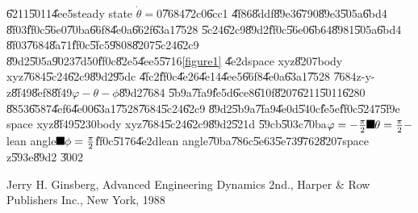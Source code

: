 \documentclass{article}
\begin{document}
\U{6211}\U{5011}\U{4ee5}steady state $\dot{\theta}=0$\U{7684}\U{72c0}\U{6cc1}%
\U{4f86}\U{8ddf}\U{89e3}\U{6790}\U{89e3}\cite{Ginsberg}\U{505a}\U{6bd4}%
\U{8f03}\U{ff0c}\U{56e0}\U{70ba}\U{66f8}\U{4e0a}\U{662f}\U{63a1}\U{7528}%
\U{5c24}\U{62c9}\U{89d2}\U{ff0c}\U{56e0}\U{6b64}\U{8981}\U{505a}\U{6bd4}%
\U{8f03}\U{7684}\U{8a71}\U{ff0c}\U{5fc5}\U{9808}\U{8207}\U{5c24}\U{62c9}%
\U{89d2}\U{505a}\U{9023}\U{7d50}\U{ff0c}\U{82e5}\U{4ee5}\U{5716}\ref{figure1}%
\U{4e2d}space xyz\U{8207}body xyz\U{7684}\U{5c24}\U{62c9}\U{89d2}\U{95dc}%
\U{4fc2}\U{ff0c}\U{4e26}\U{4e14}\U{4ee5}\U{66f8}\U{4e0a}\U{63a1}\U{7528}%
\U{7684}z-y-z\U{8f49}\U{8ef8}\U{8f49}$\varphi -\theta -\phi $\U{89d2}\U{7684}%
\U{5b9a}\U{7fa9}\U{fe5d}\U{6ce8}\U{610f}\U{8207}\U{6211}\U{5011}\U{6280}%
\U{8853}\U{6587}\U{4ef6}\U{4e00}\U{63a1}\U{7528}\U{7684}\U{5c24}\U{62c9}%
\U{89d2}\U{5b9a}\U{7fa9}\U{4e0d}\U{540c}\U{fe5e}\U{ff0c}\U{5247}\U{5f9e}%
space xyz\U{8f49}\U{5230}body xyz\U{7684}\U{5c24}\U{62c9}\U{89d2}\U{521d}%
\U{59cb}\U{503c}\U{70ba}$\varphi =-\frac{\pi }{2}\U{ff0c} \theta =\frac{\pi 
}{2}-$lean angle$\U{ff0c} \phi =\frac{\pi }{2}$\U{ff0c}\U{5176}\U{4e2d}lean
angle\U{70ba}\U{786c}\U{5e63}\U{5e73}\U{9762}\U{8207}space z\U{593e}\U{89d2}%
\U{3002}

\bigskip

\begin{thebibliography}{9}
 Jerry H. Ginsberg, Advanced Engineering Dynamics 2nd.,
Harper \& Row Publishers Inc., New York, 1988
\end{thebibliography}
\end{document}
